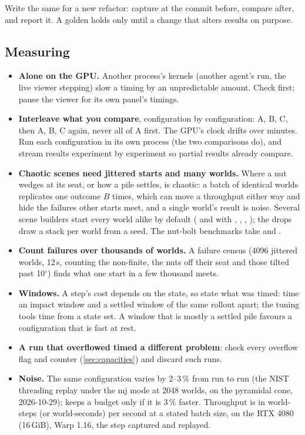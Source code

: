 Write the same for a new refactor: capture at the commit before, compare after, and report it. A golden holds only until a change that alters results on purpose.

\subsection{Measuring}\label{sec:measure}

\begin{itemize}
\item \textbf{Alone on the GPU.} Another process's kernels (another agent's run, the live viewer stepping) slow a timing by an unpredictable amount. Check  first; pause the viewer for its own panel's timings.
\item \textbf{Interleave what you compare}, configuration by configuration: A, B, C, then A, B, C again, never all of A first. The GPU's clock drifts over minutes. Run each configuration in its own process (the two comparisons do), and stream results experiment by experiment so partial results already compare.
\item \textbf{Chaotic scenes need jittered starts and many worlds.} Where a nut wedges at its seat, or how a pile settles, is chaotic: a batch of identical worlds replicates one outcome $B$ times, which can move a throughput either way and hide the failures other starts meet, and a single world's result is noise. Several scene builders start every world alike by default ( and  with , , , ); the drops draw a stack per world from a seed. The nut-bolt benchmarks take  and .
\item \textbf{Count failures over thousands of worlds.} A failure census (4096 jittered worlds, 12\,s, counting the non-finite, the nuts off their seat and those tilted past 10$^\circ$) finds what one start in a few thousand meets.
\item \textbf{Windows.} A step's cost depends on the state, so state what was timed: time an impact window and a settled window of the same rollout apart; the tuning tools time from a state set. A window that is mostly a settled pile favours a configuration that is fast at rest.
\item \textbf{A run that overflowed timed a different problem}: check every overflow flag and counter (\cref{sec:capacities}) and discard such runs.
\item \textbf{Noise.} The same configuration varies by 2--3\,\% from run to run (the NIST threading replay under the mj mode at 2048 worlds, on the pyramidal cone, 2026-10-29);  keeps a budget only if it is 3\,\% faster. Throughput is in world-steps (or world-seconds) per second at a stated batch size, on the RTX 4080 (16\,GiB), Warp 1.16, the step captured and replayed.
\end{itemize}

